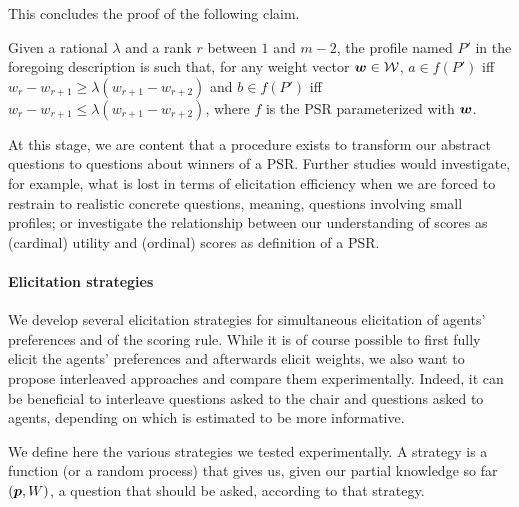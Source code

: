 This concludes the proof of the following claim. 
\begin{claim}
	Given a rational $\lambda$ and a rank $r$ between $1$ and $m - 2$, the profile named $P'$ in the foregoing description is such that, for any weight vector $\bm{w} \in \mathcal{W}$, $a \in f(P')$ iff $w_{r} - w_{r+1} ≥ \lambda (w_{r+1} - w_{r+2})$ and $b \in f(P')$ iff $w_{r} - w_{r+1} ≤ \lambda (w_{r+1} - w_{r+2})$, where $f$ is the PSR parameterized with $\bm{w}$.
\end{claim}
At this stage, we are content that a procedure exists to transform our abstract questions to questions about winners of a PSR. Further studies would investigate, for example, what is lost in terms of elicitation efficiency when we are forced to restrain to realistic concrete questions, meaning, questions involving small profiles; or investigate the relationship between our understanding of scores as (cardinal) utility and (ordinal) scores as definition of a PSR.

\paragraph{Elicitation strategies}
We develop several elicitation strategies for simultaneous elicitation of agents' preferences and of the scoring rule.
While it is of course possible to first fully elicit the agents’ preferences and afterwards elicit weights, we also want to propose interleaved approaches and compare them experimentally.
Indeed, it can be beneficial to interleave questions asked to the chair and questions asked to agents, depending on which is estimated to be more informative.

We define here the various strategies we tested experimentally. A strategy is a function (or a random process) that gives us, given our partial knowledge so far $({\bm{p}}, W)$, a question that should be asked, according to that strategy. 


